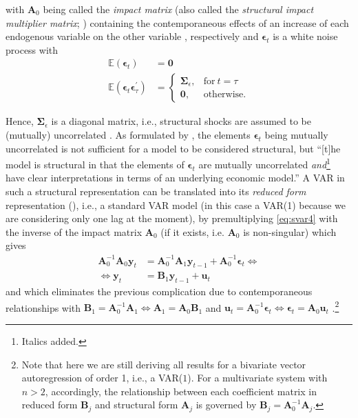 \documentclass[a4paper,11pt,listof=nochaptergap,oneside,pointednumbers,bibtotoc,bigheadings,liststotoc,hidelinks]{scrbook}
\theoremstyle{mysatz}
\theoremstyle{mydefinition}
\theoremstyle{mytheorem}
\theoremstyle{mybemerkung}
\newcommand{\vect}[1]{\boldsymbol{\mathbf{#1}}}
\begin{document}
with $\vect{A}_0$ being called the \textit{impact matrix} (also called the \textit{structural impact multiplier matrix}; \citealp{lutkepohlkilian:17}) containing the contemporaneous effects of an increase of each endogenous variable on the other variable \citep{lutkepohlkilian:17}, respectively and $\vect{\epsilon}_t$ is a white noise process with
\begin{equation}
\begin{split}
	\mathbb{E}(\vect{\epsilon}_t) &  = \vect{0}  \\
	\mathbb{E}(\vect{\epsilon}_t\vect{\epsilon}_{\tau}^') & =     \begin{cases}
      												\vect{\Sigma}_\epsilon, & \text{for}\ t = \tau \\
      												\vect{0}, & \text{otherwise.}
   								  \end{cases}
\end{split}								
\end{equation}

Hence, $\vect{\Sigma}_\epsilon$ is a diagonal matrix, i.e., structural shocks are assumed to be (mutually) uncorrelated \citep{lutkepohlkilian:17}. As formulated by \citet[p. 109/p. 217]{lutkepohlkilian:17}, the elements $\vect{\epsilon}_t$ being mutually uncorrelated is not sufficient for a model to be considered structural, but  ``[t]he model is structural in that the elements of $\vect{\epsilon}_t$ are mutually uncorrelated \textit{and}\footnote{Italics added.} have clear interpretations in terms of an underlying economic model.'' A VAR in such a structural representation can be translated into its \textit{reduced form} representation (\citealp{lutkepohlkilian:17}), i.e., a standard VAR model (in this case a VAR(1) because we are considering only one lag at the moment), by premultiplying \ref{eq:svar4} with the inverse of the impact matrix $\vect{A}_0$ (if it exists, i.e. $\vect{A}_0$ is non-singular) which gives
\begin{equation} \label{eq:svar5}
\begin{split}
	          \vect{A}_0^{-1}\vect{A}_0\vect{y}_t & = \vect{A}_0^{-1}\vect{A}_1\vect{y}_{t-1} + \vect{A}_0^{-1}\vect{\epsilon}_t     \iff \\
	\iff 						\vect{y}_t & = \vect{B}_1\vect{y}_{t-1} + \vect{u}_t
\end{split}								
\end{equation}
and which eliminates the previous complication due to contemporaneous relationships with $\vect{B}_1 = \vect{A}_0^{-1}\vect{A}_1 \iff \vect{A}_1 = \vect{A}_0\vect{B}_1$ and $\vect{u}_t = \vect{A}_0^{-1}\vect{\epsilon}_t \iff \vect{\epsilon}_t = \vect{A}_0\vect{u}_t$ \citep{lutkepohlkilian:17}.\footnote{Note that here we are still deriving all results for a bivariate vector autoregression of order 1, i.e., a VAR($1$). For a multivariate system with $n>2$, accordingly, the relationship between each coefficient matrix in reduced form $\vect{B}_j$ and structural form $\vect{A}_j$ is governed by $\vect{B}_j = \vect{A}_0^{-1}\vect{A}_j$.}
\end{document}
